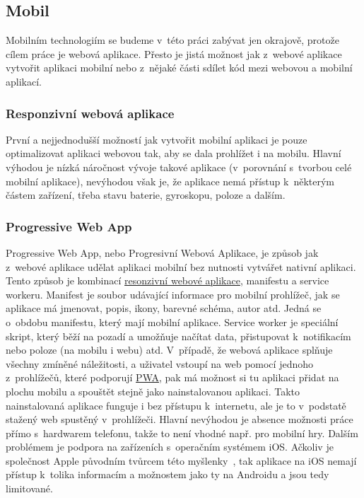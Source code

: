\subsection{Mobil}
\label{ss:mobile}
Mobilním technologiím se budeme v~této práci zabývat jen okrajově, protože cílem práce je webová aplikace. Přesto je jistá možnost jak z~webové aplikace vytvořit aplikaci mobilní nebo z~nějaké části sdílet kód mezi webovou a mobilní aplikací.

\subsubsection*{Responzivní webová aplikace}
\label{sss:responsive_web_app}
První a nejjednodušší možností jak vytvořit mobilní aplikaci je pouze optimalizovat aplikaci webovou tak, aby se dala prohlížet i na mobilu. Hlavní výhodou je nízká náročnost vývoje takové aplikace (v~porovnání s~tvorbou celé mobilní aplikace), nevýhodou však je, že aplikace nemá přístup k~některým částem zařízení, třeba stavu baterie, gyroskopu, poloze a dalším.

\subsubsection*{Progressive Web App}
\label{sss:pwa}
Progressive Web App, nebo Progresivní Webová Aplikace, je způsob jak z~webové aplikace udělat aplikaci mobilní bez nutnosti vytvářet nativní aplikaci. Tento způsob je kombinací \hyperref[sss:responsive_web_app]{resonzivní webové aplikace}, manifestu a service workeru. Manifest je soubor udávající informace pro mobilní prohlížeč, jak se aplikace má jmenovat, popis, ikony, barevné schéma, autor atd. Jedná se o~obdobu manifestu, který mají mobilní aplikace. Service worker je speciální skript, který běží na pozadí a umožňuje načítat data, přistupovat k~notifikacím nebo poloze (na mobilu i webu) atd. V~případě, že webová aplikace splňuje všechny zmíněné náležitosti, a uživatel vstoupí na web pomocí jednoho z~prohlížečů, které podporují \hyperref[sss:pwa]{PWA}, pak má možnost si tu aplikaci přidat na plochu mobilu a spouštět stejně jako nainstalovanou aplikaci. Takto nainstalovaná aplikace funguje i bez přístupu k~internetu, ale je to v~podstatě stažený web spustěný v~prohlížeči. Hlavní nevýhodou je absence možnosti práce přímo s~hardwarem telefonu, takže to není vhodné např. pro mobilní hry. Dalším problémem je podpora na zařízeních s~operačním systémem iOS. Ačkoliv je společnost Apple původním tvůrcem této myšlenky~\cite{ritchie_2018_app}, tak aplikace na iOS nemají přístup k~tolika informacím a možnostem jako ty na Androidu a jsou tedy limitované.

